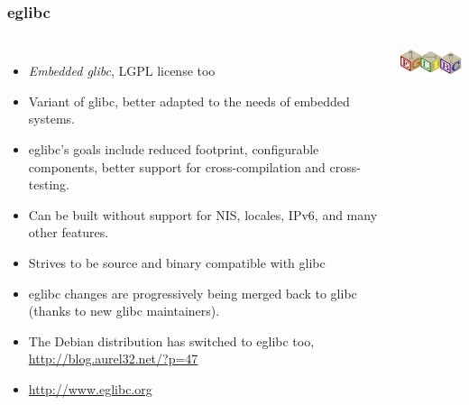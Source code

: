 \begin{frame}
  \frametitle{eglibc}
  \begin{columns}
    \begin{itemize}
    \item {\em Embedded glibc}, LGPL license too
    \item Variant of glibc, better adapted
      to the needs of embedded systems.
    \item eglibc's goals include reduced footprint, configurable
      components, better support for cross-compilation and
      cross-testing.
    \item Can be built without support for NIS, locales, IPv6, and many
      other features.
    \item Strives to be source and binary compatible with glibc
    \item eglibc changes are progressively being merged back to glibc
      (thanks to new glibc maintainers). 
    \item The Debian distribution has switched to eglibc too,
      \url{http://blog.aurel32.net/?p=47}
    \item \url{http://www.eglibc.org}
    \end{itemize}
    \includegraphics[width=\textwidth]{slides/c-libraries/eglibc.png}
  \end{columns}
\end{frame}

